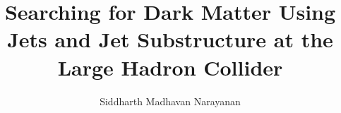 % 
% 
%
%
%
%
%
%
%
% 
% 

\title{Searching for Dark Matter Using Jets and Jet Substructure at the Large Hadron Collider}

\author{Siddharth Madhavan Narayanan}


